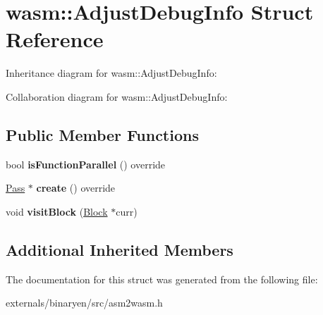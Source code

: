 \hypertarget{structwasm_1_1_adjust_debug_info}{}\section{wasm\+:\+:Adjust\+Debug\+Info Struct Reference}
\label{structwasm_1_1_adjust_debug_info}


Inheritance diagram for wasm\+:\+:Adjust\+Debug\+Info\+:


Collaboration diagram for wasm\+:\+:Adjust\+Debug\+Info\+:
\subsection*{Public Member Functions}
\begin{DoxyCompactItemize}
\item 
\mbox{\label{structwasm_1_1_adjust_debug_info_a9233befde732a975bcbd0e77dd07ca52}} 
bool {\bfseries is\+Function\+Parallel} () override
\item 
\mbox{\label{structwasm_1_1_adjust_debug_info_ac0241271a290942053ab5ec7e19c00b5}} 
\mbox{\hyperlink{classwasm_1_1_pass}{Pass}} $\ast$ {\bfseries create} () override
\item 
\mbox{\label{structwasm_1_1_adjust_debug_info_a625b64c75789aad48e712e0f87a71614}} 
void {\bfseries visit\+Block} (\mbox{\hyperlink{classwasm_1_1_block}{Block}} $\ast$curr)
\end{DoxyCompactItemize}
\subsection*{Additional Inherited Members}


The documentation for this struct was generated from the following file\+:\begin{DoxyCompactItemize}
\item 
externals/binaryen/src/asm2wasm.\+h\end{DoxyCompactItemize}
